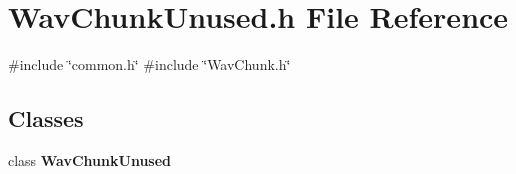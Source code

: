 \section{Wav\+Chunk\+Unused.\+h File Reference}
\label{WavChunkUnused_8h}
{\ttfamily \#include \char`\"{}common.\+h\char`\"{}}\newline
{\ttfamily \#include \char`\"{}Wav\+Chunk.\+h\char`\"{}}\newline
\subsection*{Classes}
\begin{DoxyCompactItemize}
\item 
class \textbf{ Wav\+Chunk\+Unused}
\end{DoxyCompactItemize}
